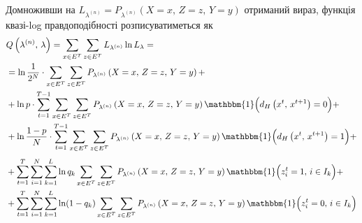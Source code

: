 Домноживши на $L_{\lambda^{(n)}} = P_{\lambda^{(n)}} \left( X=x,\,Z=z,\,Y=y \right)$ отриманий вираз, функція квазі-log правдоподібності розписуватиметься як
\begin{align*}
    &Q\left( \lambda^{(n)},\,\lambda \right) = \sum\limits_{x \in E^T} \sum\limits_{z \in E^T} L_{\lambda^{(n)}} \ln L_{\lambda} = \\
    &= \ln \frac{1}{2^N} \cdot \sum\limits_{x \in E^T} \sum\limits_{z \in E^T} P_{\lambda^{(n)}} \left( X=x,\,Z=z,\,Y=y \right) + \\
    &+ \ln p \cdot \sum\limits_{t=1}^{T-1} \sum\limits_{x \in E^T} \sum\limits_{z \in E^T} P_{\lambda^{(n)}} \left( X=x,\,Z=z,\,Y=y \right) \mathbbm{1} \Bigl( d_H\left( x^t,\,x^{t+1} \right) = 0 \Bigr) + \\
    &+ \ln \frac{1-p}{N} \cdot \sum\limits_{t=1}^{T-1} \sum\limits_{x \in E^T} \sum\limits_{z \in E^T} P_{\lambda^{(n)}} \left( X=x,\,Z=z,\,Y=y \right) \mathbbm{1} \Bigl( d_H\left( x^t,\,x^{t+1} \right) = 1 \Bigr) +
\end{align*}
\begin{align*} 
    &+ \sum\limits_{t=1}^T \sum\limits_{i=1}^N \sum\limits_{k=1}^L \ln{q_k} \sum\limits_{x \in E^T} \sum\limits_{z \in E^T} P_{\lambda^{(n)}} \left( X=x,\,Z=z,\,Y=y \right) \mathbbm{1} \Bigl( z^t_i=1,\,i \in I_k \Bigr) + \\
    &+ \sum\limits_{t=1}^T \sum\limits_{i=1}^N \sum\limits_{k=1}^L \ln(1-q_k) \sum\limits_{x \in E^T} \sum\limits_{z \in E^T} P_{\lambda^{(n)}} \left( X=x,\,Z=z,\,Y=y \right) \mathbbm{1} \Bigl( z^t_i=0,\,i \in I_k \Bigr)
\end{align*}

